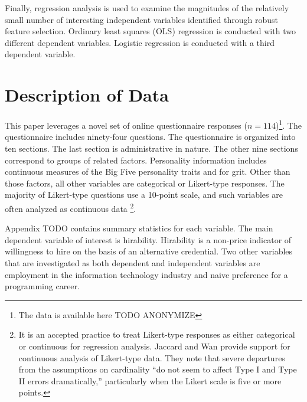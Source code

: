 \documentclass[review]{elsarticle}
\begin{document}
Finally, regression analysis is used to examine the magnitudes of the relatively small
number of interesting independent variables identified through robust feature selection.
Ordinary least squares (OLS) regression is conducted with two different dependent variables.
Logistic regression is conducted with a third dependent variable.


\section{Description of Data}

This paper leverages a novel set of online questionnaire responses ($n = 114$)\footnote{
    The data is available here TODO ANONYMIZE
}.
The questionnaire includes ninety-four questions.
The questionnaire is organized into ten sections.
The last section is administrative in nature.
The other nine sections correspond to groups of related factors.
Personality information includes continuous measures of the Big Five personality traits and for grit.
Other than those factors, all other variables are categorical or Likert-type responses.
The majority of Likert-type questions use a 10-point scale, and such variables are often analyzed as continuous data
\footnote{
    It is an accepted practice to treat Likert-type responses as either categorical or continuous for regression analysis.
    Jaccard and Wan provide support for continuous analysis of Likert-type data.
    They note that severe departures from the assumptions on cardinality ``do not seem to affect Type I and Type II errors dramatically,''
    particularly when the Likert scale is five or more points\cite{jaccard1996lisrel}.
}.

Appendix TODO contains summary statistics for each variable.
The main dependent variable of interest is hirability.
Hirability is a non-price indicator of willingness to hire on the basis of an alternative credential.
Two other variables that are investigated as both dependent and independent variables are
employment in the information technology industry
and naive preference for a programming career.
\end{document}
